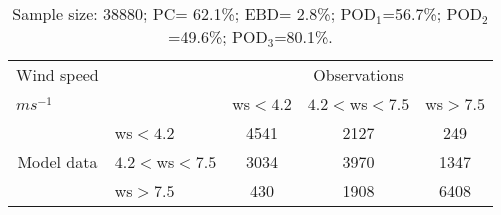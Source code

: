 \documentclass[11pt,english]{article}
\begin{document}
\begin{table}[tbp]
\begin{center}
\begin{tabular}{llccc}
\hline
{Wind speed}                                       &                                                    & \multicolumn{3}{c}{Observations}                 \\
{$m s^{-1}$}                                       &                             & ws$<4.2$   & $4.2<$ws$<7.5$ & ws$>7.5$ \\
\hline
\multicolumn{1}{c}{\multirow{3}{*}{Model data}}  & ws$<4.2$          & 4541                & 2127                       & 249              \\
                                                 & $4.2<$ws$<7.5$ & 3034                & 3970                       & 1347              \\
                                                 & ws$>7.5$          & 430                & 1908                       & 6408              \\
\hline
\end{tabular}
\end{center}
\caption{Sample size:        38880; PC= 62.1\%; EBD= 2.8\%; POD$_1$=56.7\%; POD$_2$=49.6\%; POD$_3$=80.1\%.}\label{tab:contingency}
\end{table}
\newpage
\end{document}
